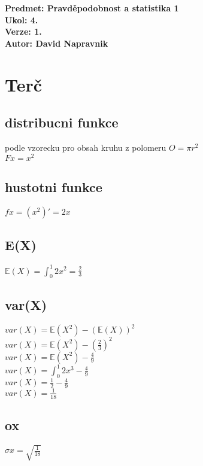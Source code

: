 \documentclass[a4paper]{article}
\begin{document}
\noindent
\textbf{Predmet: Pravděpodobnost a statistika 1}\\
\textbf{Ukol: 4.}\\
\textbf{Verze: 1.}\\
\textbf{Autor: David Napravnik}

\section*{Terč}
\subsection*{distribucni funkce}
podle vzorecku pro obsah kruhu z polomeru $O=\pi r^2$\\
$Fx = x^2$


\subsection*{hustotni funkce}
$fx = (x^2)' = 2x$


\subsection*{E(X)}
$\mathbb{E}(X) = \int_0^1 2x^2 = \frac{2}{3}$\\


\subsection*{var(X)}
$var(X) = \mathbb{E}(X^2) - (\mathbb{E}(X))^2$\\
$var(X) = \mathbb{E}(X^2) - (\frac{2}{3})^2$\\
$var(X) = \mathbb{E}(X^2) - \frac{4}{9}$\\
$var(X) = \int_0^1 2x^3 - \frac{4}{9}$\\
$var(X) = \frac{1}{2} - \frac{4}{9}$\\
$var(X) = \frac{1}{18}$\\



\subsection*{ox}
$\sigma x = \sqrt{\frac{1}{18}}$
\end{document}
